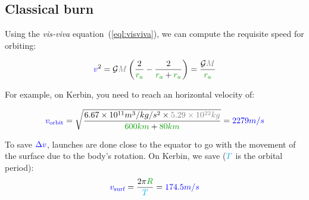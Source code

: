 \subsection{Classical burn}

Using the \emph{vis-viva} equation~(\ref{eql:visviva}), we can compute
the requisite speed for orbiting:

\[
\speed{v}^2
=
\mathcal G \mass{M} \left(\frac 2 {\dist{r_a}} - \frac 2 {\dist{r_a}+\dist{r_a}}\right)
=
\frac {\mathcal G \mass{M}} {\dist{r_a}}
\]

For example, on Kerbin, you need to reach an horizontal velocity of:

\[
\speed{v_{\text{orbit}}}
=
\sqrt{\frac {6.67 \times 10^{11} m^3/kg/s^2 \times \mass{5.29 \times 10^{22} kg}} {\dist{600km} + \dist{80km}}}
=
\speed{2279 m/s}
\]

\begin{remark}
To save $\textcolor{blue}{\Delta v}$, launches are done close to the equator to go
with the movement of the surface due to the body's rotation. On Kerbin,
we save ($\textcolor{cyan}{T}$ is the orbital period): \[
\speed{v_{\text{surf}}}
=
\frac {2\pi \dist{R}} {\delay{T}}
=
\speed{174.5 m/s}
\]
\end{remark}
